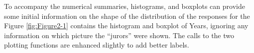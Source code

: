 \documentclass[]{book}
\newenvironment{Shaded}{\begin{snugshade}}{\end{snugshade}}
\newcommand{\KeywordTok}[1]{\textcolor[rgb]{0.13,0.29,0.53}{\textbf{{#1}}}}
\newcommand{\DataTypeTok}[1]{\textcolor[rgb]{0.13,0.29,0.53}{{#1}}}
\newcommand{\StringTok}[1]{\textcolor[rgb]{0.31,0.60,0.02}{{#1}}}
\newcommand{\NormalTok}[1]{{#1}}
\begin{document}
To accompany the numerical summaries, histograms, and boxplots can
provide some initial information on the shape of the distribution of the
responses for the Figure \ref{fig:Figure2-1} contains the histogram and
boxplot of Years, ignoring any information on which picture the
``jurors'' were shown. The calls to the two plotting functions are
enhanced slightly to add better labels.



\begin{Shaded}
\end{Shaded}
\end{document}
